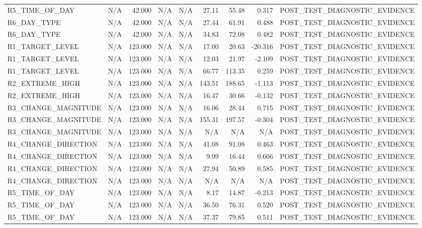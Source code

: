 \begin{table}[h!]
\begin{tabular}{lrrrrrrrr}
R5\_TIME\_OF\_DAY & N/A & 42.000 & N/A & N/A & 27.11 & 55.48 & 0.317 & POST\_TEST\_DIAGNOSTIC\_EVIDENCE \\
R6\_DAY\_TYPE & N/A & 42.000 & N/A & N/A & 27.44 & 61.91 & 0.488 & POST\_TEST\_DIAGNOSTIC\_EVIDENCE \\
R6\_DAY\_TYPE & N/A & 42.000 & N/A & N/A & 34.83 & 72.08 & 0.482 & POST\_TEST\_DIAGNOSTIC\_EVIDENCE \\
R1\_TARGET\_LEVEL & N/A & 123.000 & N/A & N/A & 17.00 & 20.63 & -20.316 & POST\_TEST\_DIAGNOSTIC\_EVIDENCE \\
R1\_TARGET\_LEVEL & N/A & 123.000 & N/A & N/A & 12.03 & 21.97 & -2.109 & POST\_TEST\_DIAGNOSTIC\_EVIDENCE \\
R1\_TARGET\_LEVEL & N/A & 123.000 & N/A & N/A & 66.77 & 113.35 & 0.259 & POST\_TEST\_DIAGNOSTIC\_EVIDENCE \\
R2\_EXTREME\_HIGH & N/A & 123.000 & N/A & N/A & 143.51 & 188.65 & -1.113 & POST\_TEST\_DIAGNOSTIC\_EVIDENCE \\
R2\_EXTREME\_HIGH & N/A & 123.000 & N/A & N/A & 16.47 & 30.66 & -0.132 & POST\_TEST\_DIAGNOSTIC\_EVIDENCE \\
R3\_CHANGE\_MAGNITUDE & N/A & 123.000 & N/A & N/A & 16.06 & 28.44 & 0.715 & POST\_TEST\_DIAGNOSTIC\_EVIDENCE \\
R3\_CHANGE\_MAGNITUDE & N/A & 123.000 & N/A & N/A & 155.31 & 197.57 & -0.304 & POST\_TEST\_DIAGNOSTIC\_EVIDENCE \\
R3\_CHANGE\_MAGNITUDE & N/A & 123.000 & N/A & N/A & N/A & N/A & N/A & POST\_TEST\_DIAGNOSTIC\_EVIDENCE \\
R4\_CHANGE\_DIRECTION & N/A & 123.000 & N/A & N/A & 41.08 & 91.08 & 0.463 & POST\_TEST\_DIAGNOSTIC\_EVIDENCE \\
R4\_CHANGE\_DIRECTION & N/A & 123.000 & N/A & N/A & 9.99 & 16.44 & 0.666 & POST\_TEST\_DIAGNOSTIC\_EVIDENCE \\
R4\_CHANGE\_DIRECTION & N/A & 123.000 & N/A & N/A & 27.94 & 50.89 & 0.585 & POST\_TEST\_DIAGNOSTIC\_EVIDENCE \\
R4\_CHANGE\_DIRECTION & N/A & 123.000 & N/A & N/A & N/A & N/A & N/A & POST\_TEST\_DIAGNOSTIC\_EVIDENCE \\
R5\_TIME\_OF\_DAY & N/A & 123.000 & N/A & N/A & 8.17 & 14.87 & -0.213 & POST\_TEST\_DIAGNOSTIC\_EVIDENCE \\
R5\_TIME\_OF\_DAY & N/A & 123.000 & N/A & N/A & 36.50 & 76.31 & 0.520 & POST\_TEST\_DIAGNOSTIC\_EVIDENCE \\
R5\_TIME\_OF\_DAY & N/A & 123.000 & N/A & N/A & 37.37 & 79.85 & 0.511 & POST\_TEST\_DIAGNOSTIC\_EVIDENCE \\

\end{tabular}
\end{table}
